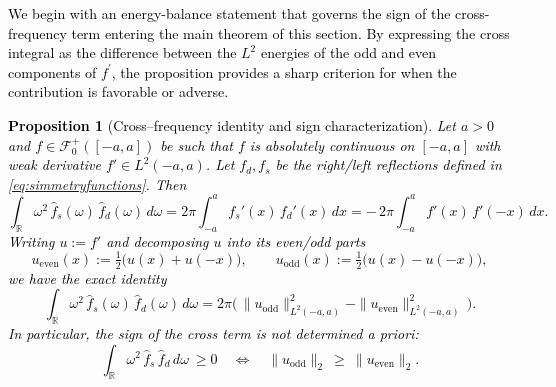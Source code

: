 \documentclass[preprint,hidelinks,authoryear]{elsarticle}
\newtheorem{Prop}[Thm]{Proposition}
\theoremstyle{plain}
\theoremstyle{definition}
\theoremstyle{remark}
\begin{document}
\textcolor{black}{
We begin with an energy-balance statement that governs the sign of the cross-frequency term entering the main theorem of this section. By expressing the cross integral as the difference between the $L^2$ energies of the odd and even components of $f^{\prime}$, the proposition provides a sharp criterion for when the contribution is favorable or adverse.
\begin{Prop}[Cross–frequency identity and sign characterization]
\label{lemma:PV}
Let $a>0$ and $f\in \mathcal{F}_0^+([-a,a])$ be such that $f$ is absolutely continuous on $[-a,a]$ with weak derivative $f'\in L^2(-a,a)$. Let $f_d,f_s$ be the right/left reflections defined in \eqref{eq:simmetryfunctions}.
Then
\begin{equation}
\label{eq:cross-identity}
\int_{\mathbb{R}}\omega^2\,\hat f_s(\omega)\,\hat f_d(\omega)\,d\omega
=2\pi\int_{-a}^a f_s'(x)\,f_d'(x)\,dx
=-\,2\pi\int_{-a}^a f'(x)\,f'(-x)\,dx.
\end{equation}
Writing $u:=f'$ and decomposing $u$ into its even/odd parts
$$
u_{\mathrm{even}}(x):=\tfrac12\big(u(x)+u(-x)\big),\qquad
u_{\mathrm{odd}}(x):=\tfrac12\big(u(x)-u(-x)\big),
$$
we have the exact identity
\begin{equation}
\label{eq:even-odd-balance}
\int_{\mathbb{R}}\omega^2\,\hat f_s(\omega)\,\hat f_d(\omega)\,d\omega
=2\pi\Big(\,\|u_{\mathrm{odd}}\|_{L^2(-a,a)}^2-\|u_{\mathrm{even}}\|_{L^2(-a,a)}^2\,\Big).
\end{equation}
In particular, the sign of the cross term is \emph{not determined a priori}:
$$
\int_{\mathbb{R}}\omega^2\,\hat f_s\,\hat f_d\,d\omega\ \ge 0
\quad\Longleftrightarrow\quad
\|u_{\mathrm{odd}}\|_{2}\ \ge\ \|u_{\mathrm{even}}\|_{2}.
$$
\end{Prop}}
\end{document}
